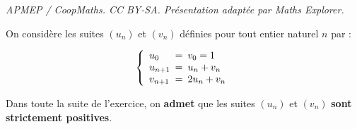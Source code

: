\documentclass[10pt]{article}
\begin{document}
\noindent\textit{APMEP / CoopMaths. CC BY-SA. Présentation adaptée par Maths Explorer.}\par\medskip
\medskip

On considère les suites $\left(u_n\right)$ et $\left(v_n\right)$ définies pour tout entier naturel $n$ par : 

\[\left\{\begin{array}{l !{=} l}
u_0		& v_0 = 1\\
u_{n+1}	& u_n +v_n\\
v_{n+1}	& 2u_n + v_n
\end{array}\right.\]

Dans toute la suite de l'exercice, on \textbf{admet} que les suites $\left(u_n\right)$ et $\left(v_n\right)$ \textbf{sont strictement positives}.

\medskip
\end{document}
